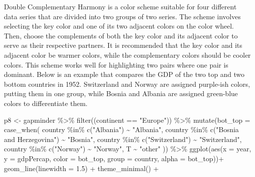 \documentclass[
  letterpaper,
]{book}
\newenvironment{Shaded}{\begin{snugshade}}{\end{snugshade}}
\newcommand{\AttributeTok}[1]{\textcolor[rgb]{0.40,0.45,0.13}{#1}}
\newcommand{\FloatTok}[1]{\textcolor[rgb]{0.68,0.00,0.00}{#1}}
\newcommand{\FunctionTok}[1]{\textcolor[rgb]{0.28,0.35,0.67}{#1}}
\newcommand{\NormalTok}[1]{\textcolor[rgb]{0.00,0.23,0.31}{#1}}
\newcommand{\OtherTok}[1]{\textcolor[rgb]{0.00,0.23,0.31}{#1}}
\newcommand{\SpecialCharTok}[1]{\textcolor[rgb]{0.37,0.37,0.37}{#1}}
\newcommand{\StringTok}[1]{\textcolor[rgb]{0.13,0.47,0.30}{#1}}
\begin{document}
Double Complementary Harmony is a color scheme suitable for four
different data series that are divided into two groups of two series.
The scheme involves selecting the key color and one of its two adjacent
colors on the color wheel. Then, choose the complements of both the key
color and its adjacent color to serve as their respective partners. It
is recommended that the key color and its adjacent color be warmer
colors, while the complementary colors should be cooler colors. This
scheme works well for highlighting two pairs where one pair is dominant.
Below is an example that compares the GDP of the two top and two bottom
countries in 1952. Switzerland and Norway are assigned purple-ish
colors, putting them in one group, while Bosnia and Albania are assigned
green-blue colors to differentiate them.

\begin{Shaded}
\begin{Highlighting}[]
\NormalTok{p8 }\OtherTok{\textless{}{-}}\NormalTok{ gapminder }\SpecialCharTok{\%\textgreater{}\%} \FunctionTok{filter}\NormalTok{((continent }\SpecialCharTok{==} \StringTok{"Europe"}\NormalTok{)) }\SpecialCharTok{\%\textgreater{}\%} \FunctionTok{mutate}\NormalTok{(}\AttributeTok{bot\_top =} \FunctionTok{case\_when}\NormalTok{(}
\NormalTok{  country }\SpecialCharTok{\%in\%} \FunctionTok{c}\NormalTok{(}\StringTok{"Albania"}\NormalTok{) }\SpecialCharTok{\textasciitilde{}} \StringTok{"Albania"}\NormalTok{,}
\NormalTok{  country }\SpecialCharTok{\%in\%} \FunctionTok{c}\NormalTok{(}\StringTok{"Bosnia and Herzegovina"}\NormalTok{) }\SpecialCharTok{\textasciitilde{}} \StringTok{"Bosnia"}\NormalTok{,}
\NormalTok{  country }\SpecialCharTok{\%in\%} \FunctionTok{c}\NormalTok{(}\StringTok{"Switzerland"}\NormalTok{) }\SpecialCharTok{\textasciitilde{}} \StringTok{"Switzerland"}\NormalTok{,}
\NormalTok{  country }\SpecialCharTok{\%in\%} \FunctionTok{c}\NormalTok{(}\StringTok{"Norway"}\NormalTok{) }\SpecialCharTok{\textasciitilde{}} \StringTok{"Norway"}\NormalTok{,}
\NormalTok{  T }\SpecialCharTok{\textasciitilde{}} \StringTok{"other"}
\NormalTok{)) }\SpecialCharTok{\%\textgreater{}\%} \FunctionTok{ggplot}\NormalTok{(}\FunctionTok{aes}\NormalTok{(}\AttributeTok{x =}\NormalTok{ year, }\AttributeTok{y =}\NormalTok{ gdpPercap, }\AttributeTok{color =}\NormalTok{ bot\_top, }\AttributeTok{group =}\NormalTok{ country, }\AttributeTok{alpha =}\NormalTok{ bot\_top))}\SpecialCharTok{+} 
  \FunctionTok{geom\_line}\NormalTok{(}\AttributeTok{linewidth =} \FloatTok{1.5}\NormalTok{) }\SpecialCharTok{+} 
  \FunctionTok{theme\_minimal}\NormalTok{() }\SpecialCharTok{+} 

\end{Highlighting}
\end{Shaded}
\end{document}
